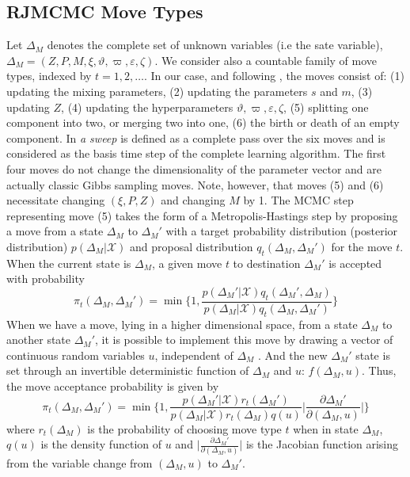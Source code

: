 \documentclass[journal,10pt]{elsart}
\begin{document}
\subsection{RJMCMC Move Types}
Let $\Delta_{M}$ denotes the complete set of unknown variables (i.e the sate variable), $\Delta_{M}=(Z,P,M,\xi,\vartheta,\varpi,\varepsilon,\zeta)$.
We consider also a countable family of move types, indexed by $t=1,2,\ldots$.
In our case, and following \cite{Green1997}, the moves consist of:
(1) updating the mixing parameters, (2) updating the parameters $s$ and $m$, (3) updating $Z$,
(4) updating the hyperparameters $\vartheta,\varpi,\varepsilon,\zeta$, (5) splitting one component into two, or merging two into one,
(6) the birth or death of an empty component. In \cite{Green1997} \emph{a sweep} is defined as a complete pass over the six moves and
is considered as the basis time step of the complete learning algorithm. The first four moves  do not change the dimensionality of the parameter
vector and are actually classic Gibbs sampling moves. Note, however, that moves (5) and (6) necessitate changing $(\xi,P,Z)$ and changing $M$ by 1.
The MCMC step representing move (5) takes the form of a Metropolis-Hastings step by proposing a move from a state $\Delta_{M}$ to
$\Delta_{M}'$ with a target probability distribution (posterior distribution) $p(\Delta_{M}|\mathcal{X})$ and proposal distribution
$q_t(\Delta_{M},\Delta_{M}')$ for the move $t$. When the current state is $\Delta_M$, a given move $t$ to destination $\Delta_M'$ is
accepted with probability
\begin{equation}
\pi_t(\Delta_M,\Delta_M')=\min \bigg\{1,\frac{p(\Delta_M'|\mathcal{X})q_t(\Delta_M',\Delta_M)}{p(\Delta_M|\mathcal{X})q_t(\Delta_M,\Delta_M')} \bigg\}
\end{equation}
When we have a move, lying in a higher dimensional space, from a state $\Delta_M$ to another state $\Delta_M'$, it is possible to implement this move by drawing a vector of continuous random variables $u$, independent of $\Delta_M$ \cite{Green1997}. And the new $\Delta_M'$ state is set through an invertible deterministic function of $\Delta_M$ and $u$: $f(\Delta_M,u)$. Thus, the move acceptance probability is given by
\begin{equation}\label{acceptanceproba}
\pi_t(\Delta_M,\Delta_M')=\min \bigg\{1,\frac{p(\Delta_M'|\mathcal{X})r_t(\Delta_M')}{p(\Delta_M|\mathcal{X})r_t(\Delta_M)q(u)}\bigg|\frac{\partial\Delta_M'}{\partial(\Delta_M,u)}\bigg| \bigg\}
\end{equation}
where $r_t(\Delta_M)$ is the probability of choosing move type $t$ when in state $\Delta_M$, $q(u)$ is the density function of $u$ and $\bigg|\frac{\partial\Delta_M'}{\partial(\Delta_M,u)}\bigg|$ is the Jacobian function arising from the variable change from $(\Delta_M,u)$ to $\Delta_M'$.
\end{document}
